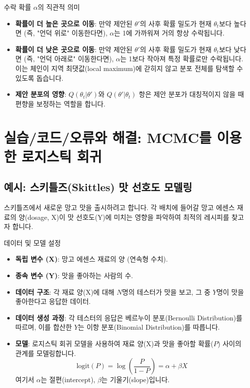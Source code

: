 \documentclass[11pt,a4paper]{article}
\begin{document}
\begin{mybox}{수락 확률 $\alpha$의 직관적 의미}
\begin{itemize}
    \item \textbf{확률이 더 높은 곳으로 이동}: 만약 제안된 $\theta'$의 사후 확률 밀도가 현재 $\theta_t$보다 높다면 (즉, "언덕 위로" 이동한다면), $\alpha$는 1에 가까워져 거의 항상 수락됩니다.
    \item \textbf{확률이 더 낮은 곳으로 이동}: 만약 제안된 $\theta'$의 사후 확률 밀도가 현재 $\theta_t$보다 낮다면 (즉, "언덕 아래로" 이동한다면), $\alpha$는 1보다 작아져 특정 확률로만 수락됩니다. 이는 체인이 지역 최댓값(local maximum)에 갇히지 않고 분포 전체를 탐색할 수 있도록 돕습니다.
    \item \textbf{제안 분포의 영향}: $Q(\theta_t | \theta')$와 $Q(\theta' | \theta_t)$ 항은 제안 분포가 대칭적이지 않을 때 편향을 보정하는 역할을 합니다.
\end{itemize}
\end{mybox}

\newpage
\section*{실습/코드/오류와 해결: MCMC를 이용한 로지스틱 회귀}

\subsection*{예시: 스키틀즈(Skittles) 맛 선호도 모델링}
스키틀즈에서 새로운 망고 맛을 출시하려고 합니다. 각 배치에 들어갈 망고 에센스 재료의 양(dosage, X)이 맛 선호도(Y)에 미치는 영향을 파악하여 최적의 레시피를 찾고자 합니다.

\begin{mybox}{데이터 및 모델 설정}
\begin{itemize}
    \item \textbf{독립 변수 (X)}: 망고 에센스 재료의 양 (연속형 수치).
    \item \textbf{종속 변수 (Y)}: 맛을 좋아하는 사람의 수.
    \item \textbf{데이터 구조}: 각 재료 양(X)에 대해 $N$명의 테스터가 맛을 보고, 그 중 $Y$명이 맛을 좋아한다고 응답한 데이터.
    \item \textbf{데이터 생성 과정}: 각 테스터의 응답은 베르누이 분포(Bernoulli Distribution)를 따르며, 이를 합산한 $Y$는 이항 분포(Binomial Distribution)를 따릅니다.
    \item \textbf{모델}: 로지스틱 회귀 모델을 사용하여 재료 양(X)과 맛을 좋아할 확률($P$) 사이의 관계를 모델링합니다.
    \[ \text{logit}(P) = \log\left(\frac{P}{1-P}\right) = \alpha + \beta X \]
    여기서 $\alpha$는 절편(intercept), $\beta$는 기울기(slope)입니다.
\end{itemize}
\end{mybox}
\end{document}
